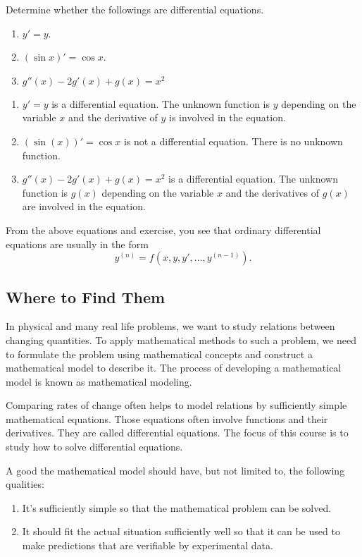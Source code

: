 \begin{exercise}
  Determine whether the followings are differential equations.
  \begin{enumerate}
    \item $y' = y$.
    \item $(\sin x)' =\cos x$.
    \item $g''(x) - 2 g'(x) + g(x) = x^2$
  \end{enumerate}
\end{exercise}
\begin{exersol}
  \begin{enumerate}
    \item $y' = y$ is a differential equation. The unknown function is $y$ depending on the variable $x$ and the derivative of $y$ is involved in the equation.
    \item $(\sin (x))' =\cos x$ is not a differential equation. There is no unknown function.
    \item $g''(x) - 2 g'(x) + g(x) = x^2$ is a differential equation. The unknown function is $g(x)$ depending on the variable $x$ and the derivatives of $g(x)$ are involved in the equation.
  \end{enumerate}
\end{exersol}

From the above equations and exercise, you see that ordinary differential equations are usually in the form
$$
  y^{(n)}=f(x, y, y', \dots, y^{(n-1)}).
$$

\subsection{Where to Find Them}

In physical and many real life problems, we want to study relations between changing quantities. To apply mathematical methods to such a problem, we need to formulate the problem using mathematical concepts and construct a mathematical model to describe it. The process of developing a mathematical model is known as mathematical modeling.

Comparing rates of change often helps to model relations by sufficiently simple mathematical equations. Those equations often involve functions and their derivatives. They are called differential equations. The focus of this course is to study how to solve differential equations.

A good the mathematical model should have, but not limited to, the following qualities:
\begin{enumerate}
  \item It’s sufficiently simple so that the mathematical problem can be solved.
  \item It should fit the actual situation sufficiently well so that it can be used to make predictions that are verifiable by experimental data.
\end{enumerate}

